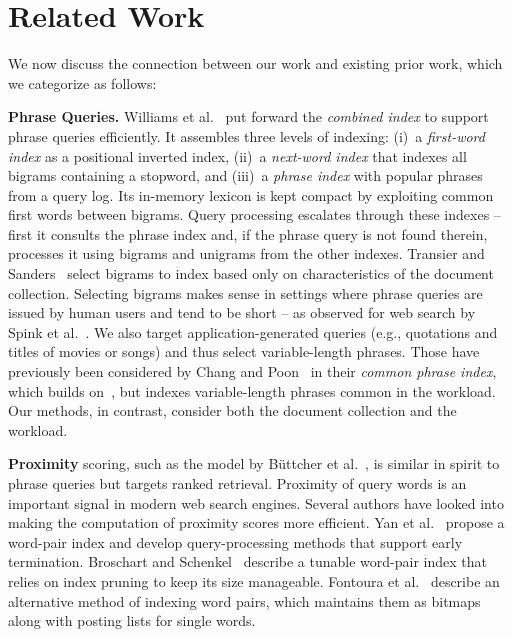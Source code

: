     
    

\section{Related Work}
\label{sec:related-work}

We now discuss the connection between our work and existing prior
work, which we categorize as follows:

\textbf{Phrase Queries.} Williams et al.~\cite{Williams:2004fk} put
forward the \emph{combined index} to support phrase queries
efficiently. It assembles three levels of indexing: (i)~a
\emph{first-word index} as a positional inverted index, (ii)~a
\emph{next-word index} that indexes all bigrams containing a stopword,
and (iii)~a \emph{phrase index} with popular phrases from a query
log. Its in-memory lexicon is kept compact by exploiting common
first words between bigrams. Query processing escalates through these
indexes -- first it consults the phrase index and, if the phrase query
is not found therein, processes it using bigrams and unigrams from the
other indexes. Transier and Sanders~\cite{Transier:2008kx} select
bigrams to index based only on characteristics of the document
collection. Selecting bigrams makes sense in settings where phrase
queries are issued by human users and tend to be short -- as observed
for web search by Spink et al.~\cite{Spink:2001}. We also target
application-generated queries (e.g., quotations and titles of movies
or songs) and thus select variable-length phrases. Those have
previously been considered by Chang and Poon~\cite{Chang:2008kx} in
their \emph{common phrase index}, which builds
on~\cite{Williams:2004fk}, but indexes variable-length phrases common
in the workload. Our methods, in contrast, consider both the document
collection and the workload.

\textbf{Proximity} scoring, such as the model by B\"uttcher
et al.~\cite{Buttcher:2006kx}, is similar in spirit to phrase queries
but targets ranked retrieval. Proximity of query words is an important
signal in modern web search engines. Several authors have looked into
making the computation of proximity scores more efficient. Yan et
al.~\cite{Yan:2010tw} propose a word-pair index and develop
query-processing methods that support early termination. Broschart and
Schenkel~\cite{BroschartS12} describe a tunable word-pair index that
relies on index pruning to keep its size manageable. Fontoura et
al.~\cite{Fontoura:2011uq} describe an alternative method of indexing
word pairs, which maintains them as bitmaps along with posting lists
for single words.

